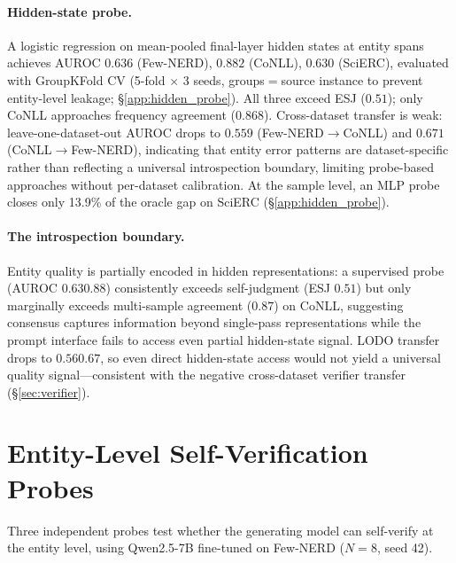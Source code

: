\paragraph{Hidden-state probe.}
A logistic regression on mean-pooled final-layer hidden states at entity spans achieves AUROC $0.636$ (Few-NERD), $0.882$ (CoNLL), $0.630$ (SciERC), evaluated with GroupKFold CV (5-fold ${\times}$ 3 seeds, groups${=}$source instance to prevent entity-level leakage; \S\ref{app:hidden_probe}).
All three exceed ESJ ($0.51$); only CoNLL approaches frequency agreement ($0.868$).
Cross-dataset transfer is weak: leave-one-dataset-out AUROC drops to $0.559$ (Few-NERD${\to}$CoNLL) and $0.671$ (CoNLL${\to}$Few-NERD), indicating that entity error patterns are dataset-specific rather than reflecting a universal introspection boundary, limiting probe-based approaches without per-dataset calibration.
At the sample level, an MLP probe closes only 13.9\% of the oracle gap on SciERC (\S\ref{app:hidden_probe}).

\paragraph{The introspection boundary.}
Entity quality is partially encoded in hidden representations: a supervised probe (AUROC $0.63$\textendash$0.88$) consistently exceeds self-judgment (ESJ $0.51$) but only marginally exceeds multi-sample agreement ($0.87$) on CoNLL, suggesting consensus captures information beyond single-pass representations while the prompt interface fails to access even partial hidden-state signal.
LODO transfer drops to $0.56$\textendash$0.67$, so even direct hidden-state access would not yield a universal quality signal---consistent with the negative cross-dataset verifier transfer (\S\ref{sec:verifier}).

\section{Entity-Level Self-Verification Probes}\label{app:self_verification}

Three independent probes test whether the generating model can self-verify at the entity level, using Qwen2.5-7B fine-tuned on Few-NERD ($N{=}8$, seed 42).

